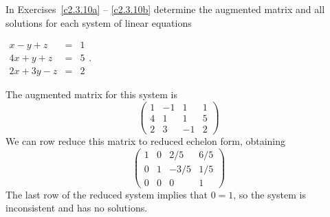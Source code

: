 \documentclass{ximera}
\begin{document}
\noindent In Exercises~\ref{c2.3.10a} -- \ref{c2.3.10b} determine the
augmented matrix and all solutions for each system of linear equations
\begin{exercise} \label{c2.3.10a}
$\begin{array}{rcl}
x-y+z & = & 1 \\
4x+y+z & = & 5 \\
   2x+3y-z & = & 2 \end{array}$.

\begin{solution}
The augmented matrix for this system is
\[
\left(\begin{array}{rrr|r} 1 & -1 & 1 & 1 \\ 4 & 1 & 1 & 5 \\
2 & 3 & -1 & 2\end{array}\right)
\]
We can row reduce this matrix to reduced echelon form, obtaining
\[
\left(\begin{array}{rrr|r} 1 & 0 & 2/5 & 6/5 \\
0 & 1 & -3/5 & 1/5 \\ 0 & 0 & 0 & 1\end{array}\right)
\]
The last row of the reduced system implies that $0 = 1$, so the system
is inconsistent and has no solutions.

\end{solution}
\end{exercise}
\end{document}

